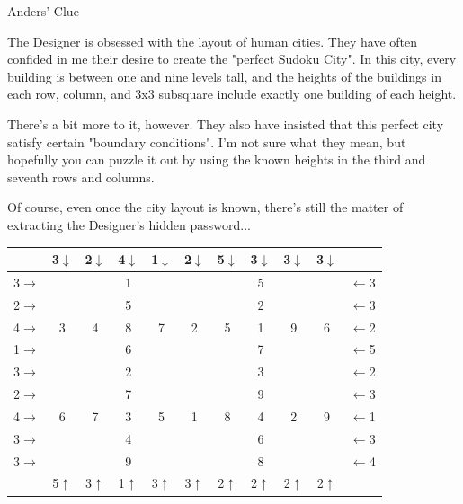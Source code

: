 \documentclass{article}
\newcommand{\clue}[1]{#1}
\begin{document}
\vfill

\newpage


\clue{
Anders' Clue

The Designer is obsessed with the layout of human cities.
They have often confided in me their desire to create the
"perfect Sudoku
City". In this city, every building is between one and nine levels
tall, and the heights of the buildings in each row, column, and
3x3 subsquare include exactly one building of each height.

There's a bit more to it, however. They also have insisted that
this perfect city satisfy certain "boundary conditions". I'm
not sure what they mean, but hopefully you can puzzle it out by using
the known heights in the third and seventh rows and columns.

Of course, even once the city layout is known, there's still the matter
of extracting the Designer's hidden password...

\begin{center}\Large
\begin{tabular}{c||c|c|c||c|c|c||c|c|c||c}
  & 3\(\downarrow\) & 2\(\downarrow\) & 4\(\downarrow\) & 1\(\downarrow\) & 2\(\downarrow\) & 5\(\downarrow\) & 3\(\downarrow\) & 3\(\downarrow\) & 3\(\downarrow\) &   \\\hline\hline
3\(\rightarrow\) &   & \color{mygray}{$\clubsuit$} & 1 &   &   &   & 5 &   &   & \(\leftarrow\)3 \\\hline
2\(\rightarrow\) &   &   & 5 &   & \color{mygray}{$\heartsuit$} &   & 2 &   & \color{mygray}{$\clubsuit$} & \(\leftarrow\)3 \\\hline
4\(\rightarrow\) & 3 & 4 & 8 & 7 & 2 & 5 & 1 & 9 & 6 & \(\leftarrow\)2 \\\hline\hline
1\(\rightarrow\) &   &   & 6 & \color{mygray}{$\clubsuit$} &   &   & 7 &   &   & \(\leftarrow\)5 \\\hline
3\(\rightarrow\) & \color{mygray}{$\diamondsuit$} &   & 2 & \color{mygray}{$\heartsuit$} &   & \color{mygray}{$\spadesuit$} & 3 & \color{mygray}{$\nabla$} &   & \(\leftarrow\)2 \\\hline
2\(\rightarrow\) &   & \color{mygray}{$\star$} & 7 &   &   &   & 9 &   & \color{mygray}{$\diamondsuit$} & \(\leftarrow\)3 \\\hline\hline
4\(\rightarrow\) & 6 & 7 & 3 & 5 & 1 & 8 & 4 & 2 & 9 & \(\leftarrow\)1 \\\hline
3\(\rightarrow\) &   & \color{mygray}{$\heartsuit$} & 4 &   & \color{mygray}{$\nabla$} &   & 6 & \color{mygray}{$\spadesuit$} &   & \(\leftarrow\)3 \\\hline
3\(\rightarrow\) &   &   & 9 &   &   & \color{mygray}{$\diamondsuit$} & 8 &   &   & \(\leftarrow\)4 \\\hline\hline
  & 5\(\uparrow\) & 3\(\uparrow\) & 1\(\uparrow\) & 3\(\uparrow\) & 3\(\uparrow\) & 2\(\uparrow\) & 2\(\uparrow\) & 2\(\uparrow\) & 2\(\uparrow\) &
\end{tabular}
\end{center}
}
\end{document}
